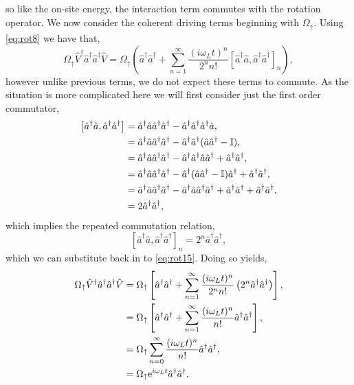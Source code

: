 so like the on-site energy, the interaction term commutes with the rotation operator. We now consider the coherent driving terms beginning with \(\Omega_{\uparrow}\). Using \cref{eq:rot8} we have that,
\begin{equation}
	\Omega_{\uparrow}\hat{V}^{\dagger}\hat{a}^{\dagger}\hat{a}^{\dagger}\hat{V} = \Omega_{\uparrow}\left(\hat{a}^{\dagger}\hat{a}^{\dagger} + \sum_{n=1}^{\infty} \frac{(i\omega_{L}t)^{n}}{2^{n}n!}[\hat{a}^{\dagger}\hat{a}, \hat{a}^{\dagger}\hat{a}^{\dagger}]_{n}\right),
	\label{eq:rot15}
\end{equation}
however unlike previous terms, we do not expect these terms to commute. As the situation is more complicated here we will first consider just the first order commutator,
\begin{align}
	\left[\hat{a}^{\dagger}\hat{a}, \hat{a}^{\dagger}\hat{a}^{\dagger}\right] &= \hat{a}^{\dagger}\hat{a}\hat{a}^{\dagger}\hat{a}^{\dagger} - \hat{a}^{\dagger}\hat{a}^{\dagger}\hat{a}^{\dagger}\hat{a}, \notag \\
	&=  \hat{a}^{\dagger}\hat{a}\hat{a}^{\dagger}\hat{a}^{\dagger} - \hat{a}^{\dagger}\hat{a}^{\dagger}(\hat{a}\hat{a}^{\dagger} - \mathbb{I}), \notag \\
	&= \hat{a}^{\dagger}\hat{a}\hat{a}^{\dagger}\hat{a}^{\dagger} - \hat{a}^{\dagger}\hat{a}^{\dagger}\hat{a}\hat{a}^{\dagger} + \hat{a}^{\dagger}\hat{a}^{\dagger}, \notag \\
	&= \hat{a}^{\dagger}\hat{a}\hat{a}^{\dagger}\hat{a}^{\dagger} - \hat{a}^{\dagger}(\hat{a}\hat{a}^{\dagger} - \mathbb{I})\hat{a}^{\dagger} + \hat{a}^{\dagger}\hat{a}^{\dagger}, \notag \\
	&= \hat{a}^{\dagger}\hat{a}\hat{a}^{\dagger}\hat{a}^{\dagger} - \hat{a}^{\dagger}\hat{a}\hat{a}^{\dagger}\hat{a}^{\dagger} + \hat{a}^{\dagger}\hat{a}^{\dagger} + \hat{a}^{\dagger}\hat{a}^{\dagger}, \notag \\
	&= 2\hat{a}^{\dagger}\hat{a}^{\dagger},
	\label{eq:rot16}
\end{align}
which implies the repeated commutation relation,
\begin{equation}
	\left[\hat{a}^{\dagger}\hat{a}, \hat{a}^{\dagger}\hat{a}^{\dagger} \right]_{n} = 2^{n}\hat{a}^{\dagger}\hat{a}^{\dagger},
	\label{eq:rot17}
\end{equation}
which we can substitute back in to \cref{eq:rot15}. Doing so yields,
\begin{align}
	\Omega_{\uparrow}\hat{V}^{\dagger}\hat{a}^{\dagger}\hat{a}^{\dagger}\hat{V} &= \Omega_{\uparrow}\left[\hat{a}^{\dagger}\hat{a}^{\dagger} + \sum_{n=1}^{\infty} \frac{(i\omega_{L}t)^{n}}{2^{n}n!}\left(2^{n}\hat{a}^{\dagger}\hat{a}^{\dagger}\right)\right], \notag \\
	&= \Omega_{\uparrow}\left[\hat{a}^{\dagger}\hat{a}^{\dagger} + \sum_{n=1}^{\infty} \frac{(i\omega_{L}t)^{n}}{n!} \hat{a}^{\dagger}\hat{a}^{\dagger}\right], \notag \\
	&= \Omega_{\uparrow}\sum_{n=0}^{\infty} \frac{(i\omega_{L}t)^{n}}{n!} \hat{a}^{\dagger}\hat{a}^{\dagger}, \notag \\
	&= \Omega_{\uparrow}\mathrm{e}^{i\omega_{L}t}\hat{a}^{\dagger}\hat{a}^{\dagger},
	\label{eq:rot18}
\end{align}

